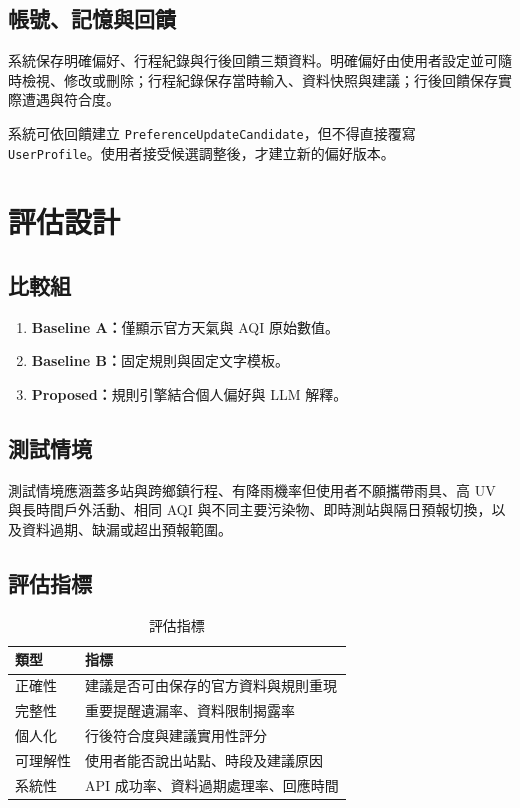 \documentclass[conference]{IEEEtran}
\begin{document}
\subsection{帳號、記憶與回饋}
系統保存明確偏好、行程紀錄與行後回饋三類資料。明確偏好由使用者設定並可隨時檢視、修改或刪除；行程紀錄保存當時輸入、資料快照與建議；行後回饋保存實際遭遇與符合度。

系統可依回饋建立 \texttt{PreferenceUpdateCandidate}，但不得直接覆寫 \texttt{UserProfile}。使用者接受候選調整後，才建立新的偏好版本。

\section{評估設計}

\subsection{比較組}
\begin{enumerate}[leftmargin=*]
\item \textbf{Baseline A：}僅顯示官方天氣與 AQI 原始數值。
\item \textbf{Baseline B：}固定規則與固定文字模板。
\item \textbf{Proposed：}規則引擎結合個人偏好與 LLM 解釋。
\end{enumerate}

\subsection{測試情境}
測試情境應涵蓋多站與跨鄉鎮行程、有降雨機率但使用者不願攜帶雨具、高 UV 與長時間戶外活動、相同 AQI 與不同主要污染物、即時測站與隔日預報切換，以及資料過期、缺漏或超出預報範圍。

\subsection{評估指標}
\begin{table}[t]
\caption{評估指標}
\label{tab:metrics}
\centering
\scriptsize
\begin{tabular}{@{}p{}p{}@{}}
\toprule
\textbf{類型} & \textbf{指標} \\
\midrule
正確性 & 建議是否可由保存的官方資料與規則重現 \\
完整性 & 重要提醒遺漏率、資料限制揭露率 \\
個人化 & 行後符合度與建議實用性評分 \\
可理解性 & 使用者能否說出站點、時段及建議原因 \\
系統性 & API 成功率、資料過期處理率、回應時間 \\
\bottomrule
\end{tabular}
\end{table}
\end{document}
